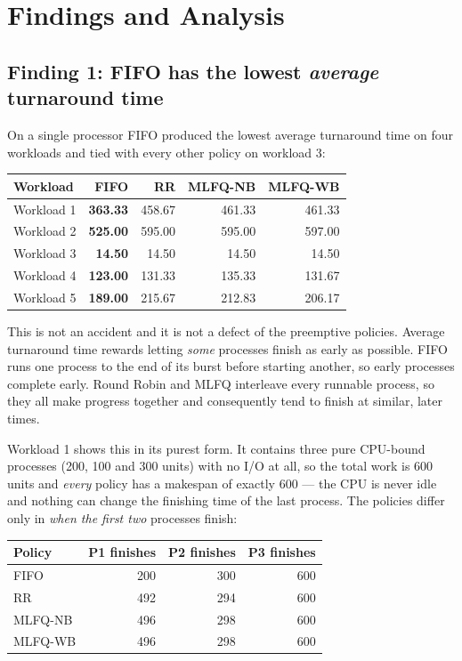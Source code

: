 \documentclass[11pt,a4paper]{article}
\begin{document}
\section{Findings and Analysis}
\subsection{Finding 1: FIFO has the lowest \emph{average} turnaround time}

On a single processor FIFO produced the lowest average turnaround time on four workloads and
tied with every other policy on workload 3:

\begin{center}\small
\begin{tabular}{lrrrr}
\toprule
\textbf{Workload} & \textbf{FIFO} & \textbf{RR} & \textbf{MLFQ-NB} & \textbf{MLFQ-WB}\\
\midrule
Workload 1 & \textbf{363.33} & 458.67 & 461.33 & 461.33 \\
Workload 2 & \textbf{525.00} & 595.00 & 595.00 & 597.00 \\
Workload 3 & \textbf{14.50} & 14.50 & 14.50 & 14.50 \\
Workload 4 & \textbf{123.00} & 131.33 & 135.33 & 131.67 \\
Workload 5 & \textbf{189.00} & 215.67 & 212.83 & 206.17 \\
\bottomrule\end{tabular}\end{center}

This is not an accident and it is not a defect of the preemptive policies. Average
turnaround time rewards letting \emph{some} processes finish as early as possible. FIFO runs
one process to the end of its burst before starting another, so early processes complete
early. Round Robin and MLFQ interleave every runnable process, so they all make progress
together and consequently tend to finish at similar, later times.

Workload 1 shows this in its purest form. It contains three pure CPU-bound processes (200,
100 and 300 units) with no I/O at all, so the total work is 600 units and \emph{every}
policy has a makespan of exactly 600 --- the CPU is never idle and nothing can change the
finishing time of the last process. The policies differ only in \emph{when the first two}
processes finish:

\begin{center}\small
\begin{tabular}{lrrr}
\toprule
\textbf{Policy} & \textbf{P1 finishes} & \textbf{P2 finishes} & \textbf{P3 finishes}\\
\midrule
FIFO & 200 & 300 & 600 \\
RR & 492 & 294 & 600 \\
MLFQ-NB & 496 & 298 & 600 \\
MLFQ-WB & 496 & 298 & 600 \\
\bottomrule\end{tabular}\end{center}
\end{document}
